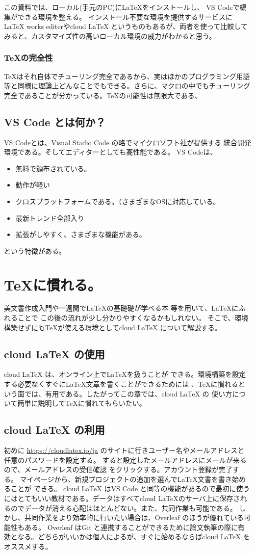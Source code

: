 \documentclass{ltjsarticle}
\begin{document}
この資料では、ローカル(手元のPC)に\LaTeX をインストールし、
VS Codeで編集ができる環境を整える。
インストール不要な環境を提供するサービスにLaTeX works editerやcloud LaTeX というものもあるが、両者を使って比較してみると、カスタマイズ性の高いローカル環境の威力がわかると思う。
\subsubsection*{\TeX の完全性}
\TeX はそれ自体でチューリング完全であるから、実はほかのプログラミング用語等と同様に理論上どんなことでもできる。さらに、マクロの中でもチューリング完全であることが分かっている。\TeX の可能性は無限大である、
\subsection{VS Code とは何か？}
VS Codeとは、Visual Stadio Code の略でマイクロソフト社が提供する
統合開発環境である。そしてエディターとしても高性能である。
VS Codeは、
\begin{itemize}
  \item 無料で頒布されている。
  \item 動作が軽い
  \item クロスプラットフォームである。（さまざまなOSに対応している。
  \item 最新トレンド全部入り
  \item 拡張がしやすく、さまざまな機能がある。
\end{itemize}
という特徴がある。
\section{\TeX に慣れる。}
美文書作成入門\cite{美文書本}や一週間で\LaTeX の基礎礎が学べる本
\cite{一週間基礎}等を用いて、\LaTeX にふれることで
この後の流れが少し分かりやすくなるかもしれない。
そこで、環境構築せずにも\TeX が使える環境としてcloud LaTeX 
について解説する。
\subsection{cloud LaTeX の使用}
cloud LaTeX は、オンライン上で\LaTeX を扱うことが
できる。環境構築を設定する必要なくすぐにLaTeX文章を書くことができるためには
、TeXに慣れるという面では、有用である。したがってこの章では、cloud LaTeX の
使い方について簡単に説明して\TeX に慣れてもらいたい。
\subsection{cloud LaTeX の利用}
初めに
\url{https://cloudlatex.io/ja}
のサイトに行きユーザー名やメールアドレスと任意のパスワードを設定する。
すると設定したメールアドレスにメールが来るので、メールアドレスの受信確認
をクリックする。アカウント登録が完了する。
マイページから、新規プロジェクトの追加を選んで\LaTeX 文書を書き始めることが
できる。
cloud LaTeX はVS Code と同等の機能があるので最初に使うにはとてもいい教材である。データはすべてcloud LaTeXのサーバ上に保存されるのでデータが消える心配はほとんどない。また、共同作業も可能である。
しかし、共同作業をより効率的に行いたい場合は、Overleaf のほうが優れている可能性もある。
Overleaf はGit と連携することができるために論文執筆の際に有効となる。どちらがいいかは個人によるが、すぐに始めるならばcloud LaTeX をオススメする。
\end{document}
